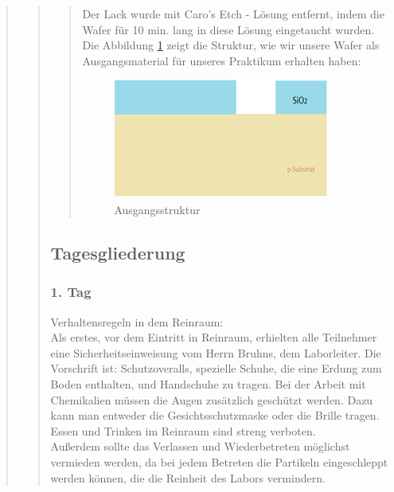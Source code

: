 \begin{quote}
\begin{quote}
\begin{quote}
			Der Lack wurde mit  Caro's Etch - Lösung entfernt, indem die Wafer 
			für 10 min. lang in diese Lösung eingetaucht wurden.\\

			Die Abbildung \ref{fig:AusStruk} zeigt die Struktur, wie wir unsere 
			Wafer als Ausgangsmaterial für unseres Praktikum erhalten haben:
            
            \vspace{2em}
            
            \begin{figure}[H]
				\hspace{5.0cm}
                \includegraphics[scale=0.8, trim = 0cm 0cm 0cm 0cm,clip]
                	{./HerstellungBilder/AusgangsStruktur.png}
                  \caption{Ausgangsstruktur}
                \label{fig:AusStruk}
            \end{figure}
            
            \vspace{2em}
            
			\end{quote}
	
	\subsection{Tagesgliederung}
	
		\subsubsection{1. Tag}
	
		Verhaltensregeln in dem Reinraum:\\

		Als erstes, vor dem Eintritt in Reinraum, erhielten alle Teilnehmer eine 
		Sicherheitseinweisung vom Herrn Bruhns, dem Laborleiter. Die Vorschrift 
		ist: Schutzoveralls, spezielle Schuhe, die eine Erdung zum Boden 
		enthalten, und Handschuhe zu tragen. Bei der Arbeit mit Chemikalien 
		müssen die Augen zusätzlich geschützt werden. Dazu kann man entweder 
		die Gesichtsschutzmaske oder die Brille tragen.\\
		Essen und Trinken im Reinraum sind streng verboten.\\
 		Außerdem sollte das Verlassen und Wiederbetreten möglichst vermieden 
 		werden, da bei jedem Betreten die Partikeln eingeschleppt werden können,
 		die die Reinheit des Labors vermindern.\\


\end{quote}
\end{quote}

